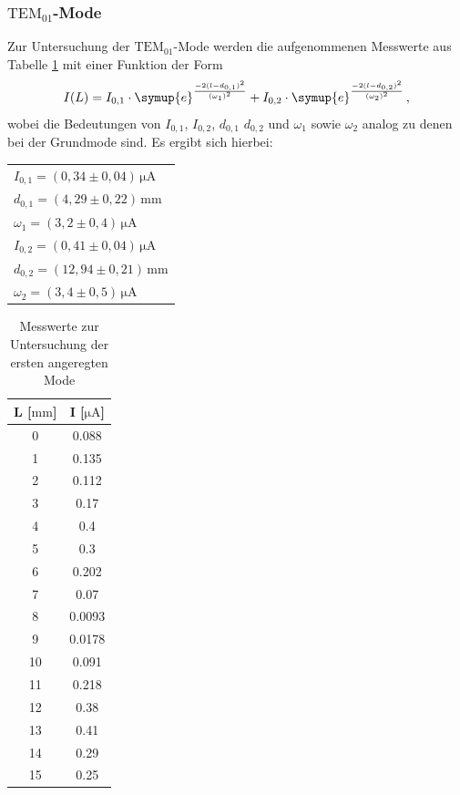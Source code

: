 \subsubsection{$\text{TEM}_{01}$-Mode}
Zur Untersuchung der $\text{TEM}_{01}$-Mode werden die aufgenommenen Messwerte aus Tabelle \ref{mode2} mit einer Funktion der Form
\begin{equation}
  I(L)=I_{0,1}\cdot\symup{e}^{\frac{-2(l-d_{0,1})^2}{(\omega_1)^2}}+I_{0,2}\cdot\symup{e}^{\frac{-2(l-d_{0,2})^2}{(\omega_2)^2}} \, ,
\end{equation}
wobei die Bedeutungen von $I_{0,1}$, $I_{0,2}$, $d_{0,1}$ $d_{0,2}$ und $\omega_1$ sowie $\omega_2$ analog zu denen bei der Grundmode sind.
Es ergibt sich hierbei:
\begin{table}[H]
  \centering
\begin{tabular}{l}
 $I_{0,1}=(0,34 \pm 0,04)\, \si{\micro\ampere}$\\
 $d_{0,1}=(4,29 \pm 0,22)\, \si{\milli\meter}$   \\
$\omega_1=(3,2 \pm 0,4)\,  \si{\micro\ampere}$ \\
$I_{0,2}=(0,41 \pm 0,04)\, \si{\micro\ampere}$\\
$d_{0,2}=(12,94 \pm 0,21)\, \si{\milli\meter}$   \\
$\omega_2=(3,4 \pm 0,5)\,  \si{\micro\ampere}$ \\
\end{tabular}
\end{table}
\begin{table}[]
  \centering
\begin{tabular}{c|c}
L [$ \si{\milli\meter}$]   &   I [$ \si{\micro\ampere}$]     \\
  \hline
0  & 0.088  \\
1  & 0.135  \\
2  & 0.112  \\
3  & 0.17   \\
4  & 0.4    \\
5  & 0.3    \\
6  & 0.202  \\
7  & 0.07   \\
8  & 0.0093 \\
9  & 0.0178 \\
10 & 0.091  \\
11 & 0.218  \\
12 & 0.38   \\
13 & 0.41   \\
14 & 0.29   \\
15 & 0.25
\end{tabular}
\caption{Messwerte zur Untersuchung der ersten angeregten Mode}
\label{mode2}
\end{table}
